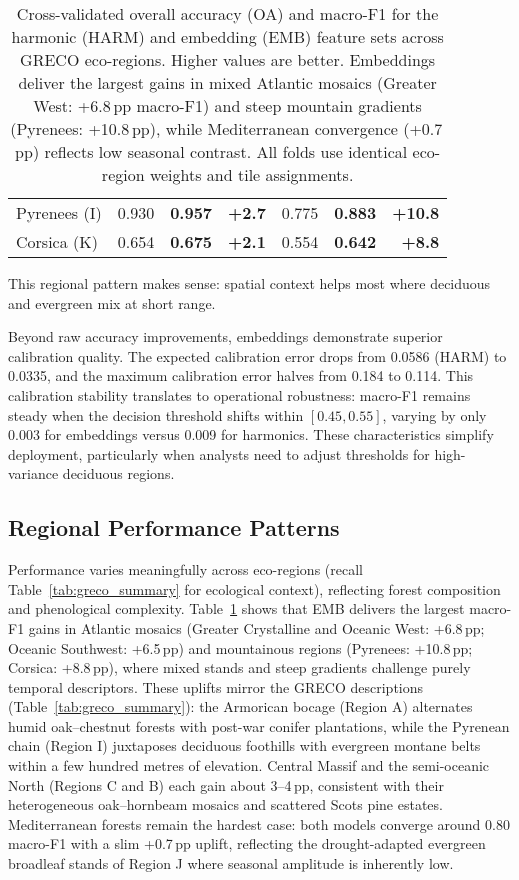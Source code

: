 \documentclass[utf8]{FrontiersinHarvard}
\begin{document}
\begin{table}[H]
\begin{tabular}{lrrrrrr}
        Pyrenees (I) & 0.930 & \textbf{0.957} & \textbf{+2.7} & 0.775 & \textbf{0.883} & \textbf{+10.8} \\
        Corsica (K) & 0.654 & \textbf{0.675} & \textbf{+2.1} & 0.554 & \textbf{0.642} & \textbf{+8.8} \\
        \bottomrule
    \end{tabular}
    \caption{Cross-validated overall accuracy (OA) and macro-F1 for the harmonic (HARM) and embedding (EMB) feature sets across GRECO eco-regions. Higher values are better. Embeddings deliver the largest gains in mixed Atlantic mosaics (Greater West: +6.8\,pp macro-F1) and steep mountain gradients (Pyrenees: +10.8\,pp), while Mediterranean convergence (+0.7\,pp) reflects low seasonal contrast. All folds use identical eco-region weights and tile assignments.}
    \label{tab:regional_performance}
\end{table}

This regional pattern makes sense: spatial context helps most where deciduous and evergreen mix at short range.

Beyond raw accuracy improvements, embeddings demonstrate superior calibration quality. The expected calibration error drops from 0.0586 (HARM) to 0.0335, and the maximum calibration error halves from 0.184 to 0.114. This calibration stability translates to operational robustness: macro-F1 remains steady when the decision threshold shifts within \([0.45,0.55]\), varying by only 0.003 for embeddings versus 0.009 for harmonics. These characteristics simplify deployment, particularly when analysts need to adjust thresholds for high-variance deciduous regions.

\subsection{Regional Performance Patterns}

Performance varies meaningfully across eco-regions (recall Table~\ref{tab:greco_summary} for ecological context), reflecting forest composition and phenological complexity. Table~\ref{tab:regional_performance} shows that EMB delivers the largest macro-F1 gains in Atlantic mosaics (Greater Crystalline and Oceanic West: +6.8\,pp; Oceanic Southwest: +6.5\,pp) and mountainous regions (Pyrenees: +10.8\,pp; Corsica: +8.8\,pp), where mixed stands and steep gradients challenge purely temporal descriptors. These uplifts mirror the GRECO descriptions (Table~\ref{tab:greco_summary}): the Armorican bocage (Region A) alternates humid oak–chestnut forests with post-war conifer plantations, while the Pyrenean chain (Region I) juxtaposes deciduous foothills with evergreen montane belts within a few hundred metres of elevation. Central Massif and the semi-oceanic North (Regions C and B) each gain about 3–4\,pp, consistent with their heterogeneous oak–hornbeam mosaics and scattered Scots pine estates. Mediterranean forests remain the hardest case: both models converge around \(0.80\) macro-F1 with a slim +0.7\,pp uplift, reflecting the drought-adapted evergreen broadleaf stands of Region J where seasonal amplitude is inherently low.
\end{document}
